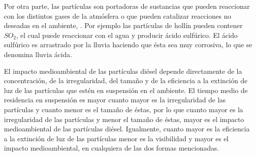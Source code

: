 \par Por otra parte, las partículas son portadoras de sustancias que pueden reaccionar con los distintos gases de la atmósfera o que pueden catalizar reacciones no deseadas en el ambiente, \cite{merolaetal:2001}. Por ejemplo las partículas de hollín pueden contener $SO_2$, el cual puede reaccionar con el agua y producir ácido sulfúrico. El ácido sulfúrico es arrastrado por la lluvia haciendo que ésta sea muy corrosiva, lo que se denomina lluvia ácida.

\par El impacto medioambiental de las partículas diésel depende directamente de la concentración, de la irregularidad, del tamaño y de la eficiencia a la extinción de luz de las partículas que estén en suspensión en el ambiente. El tiempo medio de residencia en suspensión es mayor cuanto mayor es la irregularidad de las partículas y cuanto menor es el tamaño de éstas, por lo que cuanto mayor es la irregularidad de las partículas y menor el tamaño de éstas, mayor es el impacto medioambiental de las partículas diésel. Igualmente, cuanto mayor es la eficiencia a la extinción de luz de las partículas menor es la visibilidad y mayor es el impacto medioambiental, en cualquiera de las dos formas mencionadas. 
 
\newpage
	
